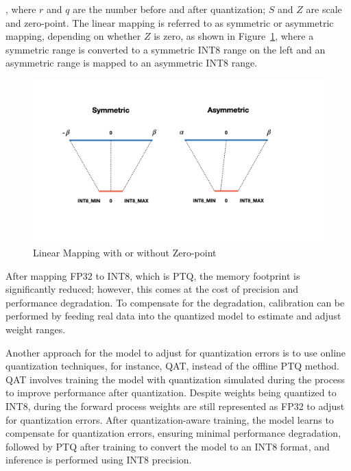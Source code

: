 \documentclass{article}
\begin{document}
    , where $r$ and $q$ are the number before and after quantization; $S$ and $Z$ are scale and zero-point. The linear mapping is referred to as symmetric or asymmetric mapping, depending on whether $Z$ is zero, as shown in Figure~\ref{fig:sub4}, where a symmetric range is converted to a symmetric INT8 range on the left and an asymmetric range is mapped to an asymmetric INT8 range.

    \begin{figure}[hbpt]
        \centering
        \includegraphics[width=1\textwidth]{pics/pa/0.003}
        \caption{Linear Mapping with or without Zero-point}
        \label{fig:sub4}
    \end{figure}

    \hspace*{1em} After mapping FP32 to INT8, which is PTQ, the memory footprint is significantly reduced; however, this comes at the cost of precision and performance degradation. To compensate for the degradation, calibration can be performed by feeding real data into the quantized model to estimate and adjust weight ranges.

    \hspace*{1em} Another approach for the model to adjust for quantization errors is to use online quantization techniques, for instance, QAT, instead of the offline PTQ method. QAT involves training the model with quantization simulated during the process to improve performance after quantization. Despite weights being quantized to INT8, during the forward process weights are still represented as FP32 to adjust for quantization errors. After quantization-aware training, the model learns to compensate for quantization errors, ensuring minimal performance degradation, followed by PTQ after training to convert the model to an INT8 format, and inference is performed using INT8 precision.
\end{document}
